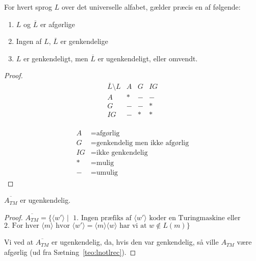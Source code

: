\begin{theorem}
	For hvert sprog $L$ over det universelle alfabet, gælder præcis en af følgende:
	\begin{enumerate}
		\item $L$ og $\overline{L}$ er afgørlige
		\item Ingen af $L$, $\overline{L}$ er genkendelige
		\item $L$ er genkendeligt, men $\overline{L}$ er ugenkendeligt, eller omvendt.
	\end{enumerate}

\end{theorem}

\begin{proof}
	\[
		\begin{array}{c|ccc}
			\overline{L} \setminus L & A & G & IG \\
			\hline
			A                        & * & - & -  \\
			G                        & - & - & *  \\
			IG                       & - & * & *  \\
		\end{array}
	\]

	\begin{align*}
		A  & = \text{afgørlig}                      \\
		G  & = \text{genkendelig men ikke afgørlig} \\
		IG & = \text{ikke genkendelig}              \\
		*  & = \text{mulig}                         \\
		-  & = \text{umulig}
	\end{align*}
\end{proof}

\begin{corollary}
	$\overline{A_{TM}}$ er ugenkendelig.
\end{corollary}
\begin{proof}
	$\overline{A_{TM}} = \{ \langle w' \rangle \mid \text{ 1. Ingen præfiks af } \langle w' \rangle \text{ koder en Turingmaskine eller}$
	$\text{2. For hver } \langle m \rangle \text{ hvor } \langle w' \rangle = \langle m \rangle \langle w \rangle \text{ har vi at } w \notin L(m)\}$

	Vi ved at $\overline{A_{TM}}$ er ugenkendelig, da, hvis den var genkendelig, så ville $A_{TM}$ være afgørlig (ud fra Sætning~\ref{teo:lnotlrec}).
\end{proof}

